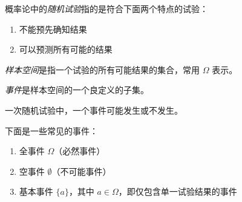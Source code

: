 \documentclass[../main.tex]{subfiles}
\begin{document}
\begin{definition}\label{def:1.2.1}
概率论中的\emph{随机试验}指的是符合下面两个特点的试验：
\begin{enumerate}
    \item 不能预先确知结果
    \item 可以预测所有可能的结果
\end{enumerate}
\end{definition}

\begin{definition}\label{def:1.2.2}
\emph{样本空间}是指一个试验的所有可能结果的集合，常用 $\Omega$ 表示。
\end{definition}

\begin{definition}\label{def:1.2.3}
\emph{事件}是样本空间的一个良定义的子集。
\end{definition}

一次随机试验中，一个事件可能发生或不发生。

下面是一些常见的事件：
\begin{enumerate}
    \item 全事件 $\Omega$（必然事件）
    \item 空事件 $\emptyset$（不可能事件）
    \item 基本事件 $\{a\}$，其中 $a\in\Omega$，即仅包含单一试验结果的事件
\end{enumerate}
\end{document}
